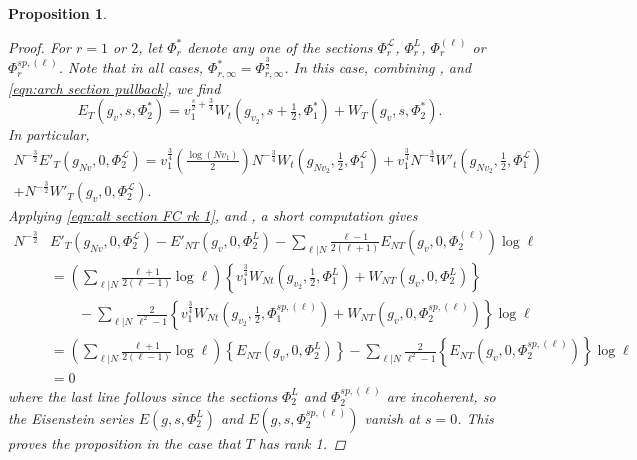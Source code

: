 \documentclass[reqno,oneside]{amsart}
\theoremstyle{plain}
\newtheorem{proposition}[theorem]{Proposition}
\theoremstyle{remark}
\numberwithin{theorem}{section}
\newcommand{\calL}{\mathcal L}
\begin{document}
\begin{proposition}
\begin{proof}
			
			For $r = 1$ or $2$, let $\Phi^*_r$ denote any one of the sections $\Phi^{\calL}_r$, $\Phi^{L}_r$, $\Phi^{(\ell)}_r$	or $\Phi^{sp, (\ell)}_r$. Note that in all cases, $\Phi^*_{r, \infty} = \Phi^{\frac32}_{r, \infty}$. In this case, combining ,  and \eqref{eqn:arch section pullback}, we find
			\begin{equation} \label{eqn:alt section FC rk 1}
			E_T(g_v, s, \Phi^*_2) = v_1^{\frac{s}2 + \frac34}W_{t}\left(g_{v_2}, s + \tfrac12,   \Phi^*_1 \right)  + W_{T}(g_v, s, \Phi^*_2).
			\end{equation}
			In particular,
			\begin{multline}
			N^{-\frac32}	E'_{T}(g_{Nv}, 0 , \Phi^{\calL}_2) =   v_1^{\frac34} \left( \frac{\log (N  v_1)}{2} \right) N^{-\frac34} W_{t}(g_{Nv_2}, \tfrac12, \Phi^{\calL}_1) +   v_1^{\frac34} N^{-\frac34}W'_t(g_{Nv_2}, \tfrac12, \Phi^{\calL}_1) \\
		  + N^{-\frac32} W'_{T}(g_v,0, \Phi^{\calL}_2).
			\end{multline}
			Applying \eqref{eqn:alt section FC rk 1},  and , a short computation gives
			\begin{align*}
			N^{- \frac32}& E'_T(g_{Nv}, 0, \Phi^{\calL}_2)  - E'_{NT}(g_v, 0, \Phi^{L}_2) - \sum_{\ell|N} \frac{\ell-1}{2(\ell+1)} E_{NT}(g_v, 0, \Phi^{(\ell)}_2) \log \ell \\
			&=  \left( \sum_{\ell|N} \frac{\ell + 1}{2(\ell - 1)} \log \ell  \right) \left\{v_1^{\frac34} W_{Nt}(g_{v_2}, \tfrac12, \Phi^L_1)  + W_{NT}(g_v, 0, \Phi^L_2 )\right\}  \\
			& \qquad -    \sum_{\ell|N} \frac{2}{\ell^2-1}  \left\{ v_1^{\frac34}W_{Nt}(g_{v_2}, \tfrac12, \Phi^{sp,(\ell)}_1)  + W_{NT}(g_v, 0, \Phi^{sp,(\ell)}_2) \right\}\log \ell\\
			& =\left( \sum_{\ell|N} \frac{\ell + 1}{2(\ell - 1)} \log \ell  \right) \left\{  E_{NT}(g_v, 0, \Phi^L_2 )\right\}   -    \sum_{\ell|N} \frac{2}{\ell^2-1}  \left\{E_{NT}(g_v, 0, \Phi^{sp,(\ell)}_2) \right\}\log \ell\\
			&= 0
			\end{align*}
			where the last line follows since the sections $\Phi^L_2$ and $\Phi_2^{sp, (\ell)}$ are incoherent, so the Eisenstein series $E(g, s, \Phi^L_2)$ and $E(g, s, \Phi_2^{sp, (\ell)})$ vanish at $s=0$. This proves the proposition in the case that $T$ has rank 1.
			

\end{proof}
\end{proposition}
\end{document}
